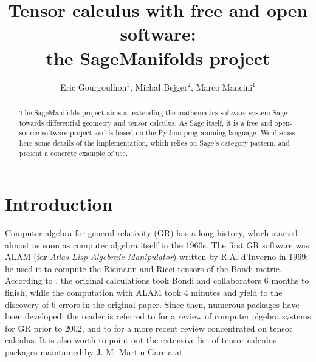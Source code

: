 \documentclass[a4paper]{jpconf}
\newcommand{\soft}[1]{\textsf{#1}}
\newcommand{\Sage}{\soft{Sage}}
\newcommand{\SM}{\soft{SageManifolds}}
\begin{document}
\title{Tensor calculus with free and open software: \\
the SageManifolds project}

\author{Eric Gourgoulhon$^1$, Micha\l{} Bejger$^2$, Marco Mancini$^1$}

\address{$^1$ Laboratoire Univers et Th\'eories, UMR 8102 du 
CNRS, Observatoire de Paris, Universit\'e Paris Diderot,
92190 Meudon, France}

\address{$^2$ Centrum Astronomiczne im. M. Kopernika, ul. Bartycka 18,
00-716 Warsaw, Poland}


\begin{abstract}
The \SM{} project aims at extending the mathematics software system \Sage{} towards
differential geometry and tensor calculus. As \Sage{} itself, it is a free 
and open-source software project and is based on the Python programming language.
We discuss here some details of the implementation, which relies 
on \Sage{}'s category pattern, and present a concrete example of use.
\end{abstract}


\section{Introduction}

Computer algebra for general relativity (GR) has a long history, which started
almost as soon as computer algebra itself in the 1960s. 
The first GR software was \soft{ALAM} (for \emph{Atlas Lisp Algebraic Manipulator})
written by R.A. d'Inverno in 1969; he used it to compute
the Riemann and Ricci tensors of the Bondi metric.
According to \cite{Skea94}, 
the original calculations took Bondi and collaborators 6 months to finish,
while the computation with \soft{ALAM} took 4 minutes and yield to the 
discovery of 6 errors in the original paper. 
Since then, numerous packages have been developed: the reader is referred to \cite{MacCa02}
for a review of computer algebra
systems for GR prior to 2002, and to \cite{KorolKS13} for a more recent review 
concentrated on tensor calculus. 
It is also worth to point out the extensive list of
tensor calculus packages maintained by J. M. Martin-Garcia at \cite{xact_links}.
\end{document}
